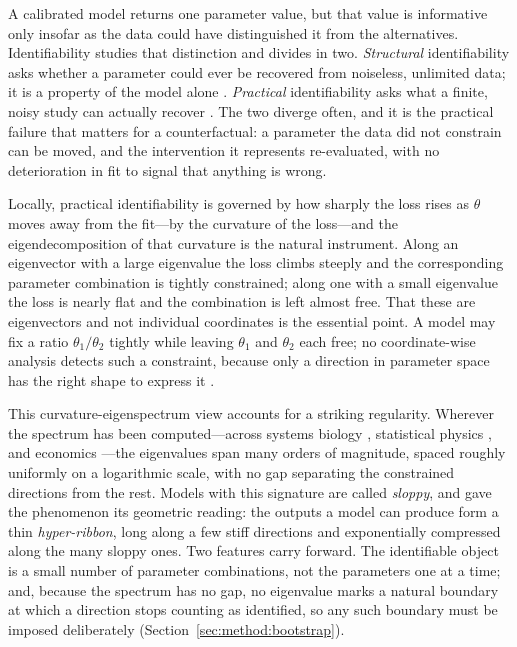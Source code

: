 \documentclass[10pt,twocolumn]{article}
\begin{document}
A calibrated model returns one parameter value, but that value is informative only
insofar as the data could have distinguished it from the alternatives.
Identifiability studies that distinction and divides in two. \emph{Structural}
identifiability asks whether a parameter could ever be recovered from noiseless,
unlimited data; it is a property of the model alone
\citep{cobelli1980parameter, wieland2021structural}. \emph{Practical}
identifiability asks what a finite, noisy study can actually recover
\citep{raue2009structural}. The two diverge often, and it is the practical failure
that matters for a counterfactual: a parameter the data did not constrain can be
moved, and the intervention it represents re-evaluated, with no deterioration in fit
to signal that anything is wrong.

Locally, practical identifiability is governed by how sharply the loss rises as
$\theta$ moves away from the fit---by the curvature of the loss---and the
eigendecomposition of that curvature is the natural instrument. Along an eigenvector
with a large eigenvalue the loss climbs steeply and the corresponding parameter
combination is tightly constrained; along one with a small eigenvalue the loss is
nearly flat and the combination is left almost free. That these are eigenvectors and
not individual coordinates is the essential point. A model may fix a ratio
$\theta_1/\theta_2$ tightly while leaving $\theta_1$ and $\theta_2$ each free; no
coordinate-wise analysis detects such a constraint, because only a direction in
parameter space has the right shape to express it
\citep{eisenberg2014determining, rothenberg1971identification}.

This curvature-eigenspectrum view accounts for a striking regularity. Wherever the
spectrum has been computed---across systems biology
\citep{gutenkunst2007universally}, statistical physics \citep{machta2013parameter},
and economics \citep{naumann2024exploration}---the eigenvalues span many orders of
magnitude, spaced roughly uniformly on a logarithmic scale, with no gap separating
the constrained directions from the rest. Models with this signature are called
\emph{sloppy}, and \citet{transtrum2010why, transtrum2011geometry} gave the
phenomenon its geometric reading: the outputs a model can produce form a thin
\emph{hyper-ribbon}, long along a few stiff directions and exponentially compressed
along the many sloppy ones. Two features carry forward. The identifiable object is a
small number of parameter combinations, not the parameters one at a time; and,
because the spectrum has no gap, no eigenvalue marks a natural boundary at which a
direction stops counting as identified, so any such boundary must be imposed
deliberately (Section~\ref{sec:method:bootstrap}).
\end{document}
